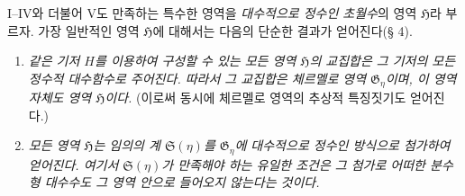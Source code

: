 
I--IV와 더불어 V도 만족하는 특수한 영역을 \emph{대수적으로 정수인 초월수}의 영역 $\mathfrak H$라 부르자. 가장 일반적인 영역 $\mathfrak H$에 대해서는 다음의 단순한 결과가 얻어진다(§ 4).
\begin{enumerate}
\item[a)] \emph{같은 기저 $H$를 이용하여 구성할 수 있는 모든 영역 $\mathfrak H$의 교집합은 그 기저의 모든 정수적 대수함수로 주어진다. 따라서 그 교집합은 체르멜로 영역 $\mathfrak G_\eta$이며, 이 영역 자체도 영역 $\mathfrak H$이다.} (이로써 동시에 체르멜로 영역의 추상적 특징짓기도 얻어진다.)
\item[b)] \emph{모든 영역 $\mathfrak H$는 임의의 계 $\mathfrak S(\eta)$를 $\mathfrak G_\eta$에 대수적으로 정수인 방식으로 첨가하여 얻어진다. 여기서 $\mathfrak S(\eta)$가 만족해야 하는 유일한 조건은 그 첨가로 어떠한 분수형 대수수도 그 영역 안으로 들어오지 않는다는 것이다.}
\end{enumerate}
